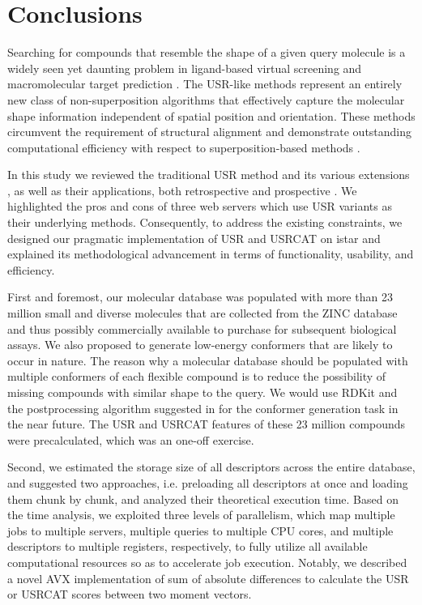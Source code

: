 \section{Conclusions}

Searching for compounds that resemble the shape of a given query molecule is a widely seen yet daunting problem in ligand-based virtual screening \citep{1332,1380,1281,1504,1502,1615} and macromolecular target prediction \citep{1407,1408,1402}. The USR-like methods \citep{1379,1338,1331} represent an entirely new class of non-superposition algorithms that effectively capture the molecular shape information independent of spatial position and orientation. These methods circumvent the requirement of structural alignment and demonstrate outstanding computational efficiency with respect to superposition-based methods \citep{1440,887,1439}.

In this study we reviewed the traditional USR method \citep{1379} and its various extensions \citep{1333,1436,1437,1334,1335,1337,1338,1331,1407,1408}, as well as their applications, both retrospective \citep{1332,1331} and prospective \citep{1505,1380,1281,1504,1502,1615}. We highlighted the pros and cons of three web servers \citep{1436,1437,1408} which use USR variants as their underlying methods. Consequently, to address the existing constraints, we designed our pragmatic implementation of USR \citep{1379} and USRCAT \citep{1331} on istar \citep{1362} and explained its methodological advancement in terms of functionality, usability, and efficiency.

First and foremost, our molecular database was populated with more than 23 million small and diverse molecules that are collected from the ZINC database \citep{532,1178} and thus possibly commercially available to purchase for subsequent biological assays. We also proposed to generate low-energy conformers that are likely to occur in nature. The reason why a molecular database should be populated with multiple conformers of each flexible compound is to reduce the possibility of missing compounds with similar shape to the query. We would use RDKit and the postprocessing algorithm suggested in \citep{1127} for the conformer generation task in the near future. The USR and USRCAT features of these 23 million compounds were precalculated, which was an one-off exercise.

Second, we estimated the storage size of all descriptors across the entire database, and suggested two approaches, i.e. preloading all descriptors at once and loading them chunk by chunk, and analyzed their theoretical execution time. Based on the time analysis, we exploited three levels of parallelism, which map multiple jobs to multiple servers, multiple queries to multiple CPU cores, and multiple descriptors to multiple registers, respectively, to fully utilize all available computational resources so as to accelerate job execution. Notably, we described a novel AVX implementation of sum of absolute differences to calculate the USR or USRCAT scores between two moment vectors.

